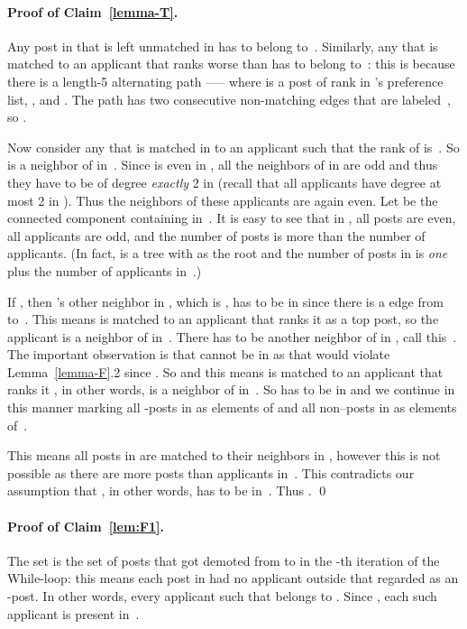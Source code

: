 \documentclass[11pt]{llncs}
\begin{document}
\paragraph{Proof of Claim~\ref{lemma-T}.}
Any post in  that is left unmatched in  has to belong to~. Similarly, any  that is
matched to an applicant  that ranks  worse than  has to belong to~: this is 
because there is a length-5 alternating path ----- where  is a post of rank  
in 's preference list, , and . The path  has
two consecutive non-matching edges that are labeled~, so .

Now consider any  that is matched in  to an applicant  such that the rank of 
 is~. So  is a neighbor of  in~.
Since  is even in , all the neighbors of  in  are odd and thus they have to be of
degree {\em exactly} 2 in  (recall that  all applicants have degree at most 2 in ).
Thus the neighbors of these applicants are again even. Let   be the connected component containing  
in~. It is easy to see that in , all posts are even, all applicants are odd, and the
number of posts is more than the number of applicants. (In fact,  is a tree with  as the root and  
the number of posts in  is {\em one} plus the number of applicants in~.)

If , then 's other neighbor in , which is , has to be in  since
there is a  edge from  to~. This means  is matched to an applicant  that ranks
it as a top post, so the applicant  is a neighbor of  in~. There has to be another
neighbor of  in , call this~. The important observation is that  cannot be in  as that would
violate Lemma~\ref{lemma-F}.2 since . So  and this means  is matched to an
applicant  that ranks it , in other words,  is a neighbor of  in~. So  has to be in  
and we continue in this manner marking all -posts in  as elements of  and all non--posts in  as elements 
of~. 

This means all posts in  are matched to their neighbors in , however this is not possible as there are more posts 
than applicants in~.  This contradicts our assumption that , in other words,  has to be in~. Thus 
. \qed




\paragraph{Proof of Claim~\ref{lem:F1}.}
The set  is the set of posts that got 
demoted from  to  in the -th iteration of the While-loop: this means each post  
in  had no applicant outside  that regarded  as an -post. 
In other words, every applicant  such that  belongs to . 
Since , each such applicant  is present in~. 
\end{document}
